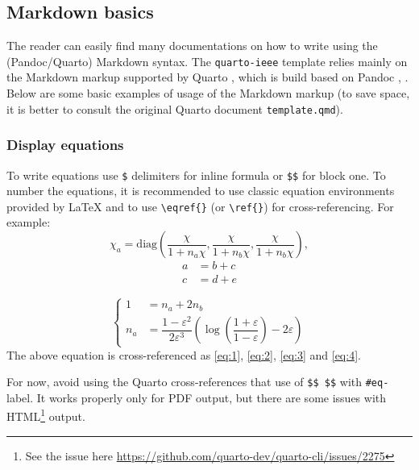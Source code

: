 \documentclass[
  twoside,
  web,
            journal,
    ]{ieeecolor}
\theoremstyle{plain}
\theoremstyle{remark}
\begin{document}
\subsection{Markdown basics}\label{sec-Markdown}

The reader can easily find many documentations on how to write using the
(Pandoc/Quarto) Markdown syntax. The \texttt{quarto-ieee} template
relies mainly on the Markdown markup supported by Quarto
, which is build based on Pandoc
,
. Below are some basic
examples of usage of the Markdown markup (to save space, it is better to
consult the original Quarto document \texttt{template.qmd}).

\subsubsection{Display equations}\label{display-equations}

To write equations use \texttt{\$} delimiters for inline formula or
\texttt{\$\$} for block one. To number the equations, it is recommended
to use classic equation environments provided by {\LaTeX} and to use
\texttt{\textbackslash{}eqref\{\}} (or \texttt{\textbackslash{}ref\{\}})
for cross-referencing. For example: \begin{equation}\label{eq:1}
{{\chi}_a}=\text{diag}\left(\frac{{\chi}}{1+n_a{\chi}},\frac{{\chi}}{1+n_b{\chi}},\frac{{\chi}}{1+n_b{\chi}}\right),
\end{equation} \begin{align}
a & = b + c \label{eq:2} \\
c & = d + e \label{eq:3}
\end{align}

\begin{equation}\label{eq:4}
\begin{cases}
    1&=n_a+2n_b \\
    n_a&=\dfrac{1-{\varepsilon}^2}{2{\varepsilon}^3}\left(\log\left(\dfrac{1+{\varepsilon}}{1-{\varepsilon}}\right)-2{\varepsilon}\right)
\end{cases}
\end{equation} The above equation is cross-referenced as \eqref{eq:1},
\eqref{eq:2}, \eqref{eq:3} and \eqref{eq:4}.

For now, avoid using the Quarto cross-references that use of
\texttt{\$\$\ \$\$} with \texttt{\#eq-} label. It works properly only
for PDF output, but there are some issues with HTML\footnote{See the
  issue here \url{https://github.com/quarto-dev/quarto-cli/issues/2275}}
output.
\end{document}
